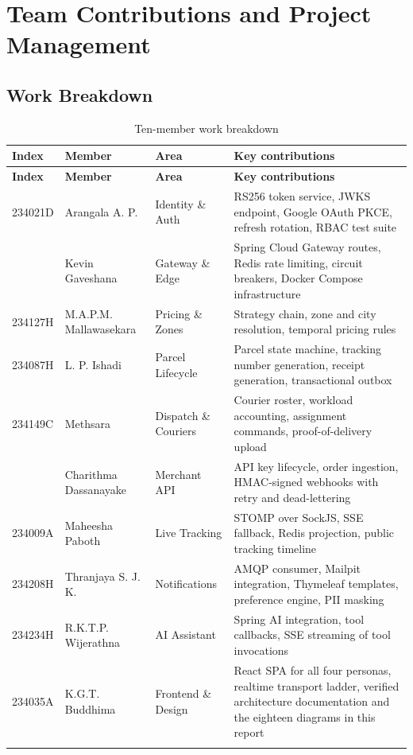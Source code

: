\documentclass[11pt,a4paper,oneside,openany]{report}
\begin{document}
\chapter{Team Contributions and Project Management}

\section{Work Breakdown}
\begin{center}
\small
\begin{longtable}{@{}p{2.0cm}p{3.4cm}p{2.9cm}p{5.1cm}@{}}
\toprule
\textbf{Index} & \textbf{Member} & \textbf{Area} & \textbf{Key contributions} \\
\midrule
\endfirsthead
\toprule
\textbf{Index} & \textbf{Member} & \textbf{Area} & \textbf{Key contributions} \\
\midrule
\endhead
234021D & Arangala A. P. & Identity \& Auth & RS256 token service, JWKS endpoint, Google OAuth
PKCE, refresh rotation, RBAC test suite \\
\addlinespace
        & Kevin Gaveshana & Gateway \& Edge & Spring Cloud Gateway routes, Redis rate limiting, circuit
breakers, Docker Compose infrastructure \\
\addlinespace
234127H & M.A.P.M. Mallawasekara & Pricing \& Zones & Strategy chain, zone and city resolution, temporal pricing
rules \\
\addlinespace
234087H & L. P. Ishadi & Parcel Lifecycle & Parcel state machine, tracking number generation,
receipt generation, transactional outbox \\
\addlinespace
234149C & Methsara & Dispatch \& Couriers & Courier roster, workload accounting,
assignment commands, proof-of-delivery upload \\
\addlinespace
        & Charithma Dassanayake & Merchant API & API key lifecycle, order ingestion, HMAC-signed
webhooks with retry and dead-lettering \\
\addlinespace
234009A & Maheesha Paboth & Live Tracking & STOMP over SockJS, SSE fallback, Redis projection,
public tracking timeline \\
\addlinespace
234208H & Thranjaya S. J. K. & Notifications & AMQP consumer, Mailpit integration, Thymeleaf
templates, preference engine, PII masking \\
\addlinespace
234234H & R.K.T.P. Wijerathna & AI Assistant & Spring AI integration, tool callbacks, SSE
streaming of tool invocations \\
\addlinespace
234035A & K.G.T. Buddhima & Frontend \& Design & React SPA for all four personas, realtime
transport ladder, verified architecture documentation and the eighteen diagrams in this report \\
\bottomrule
\caption{Ten-member work breakdown}\label{tab:team}
\end{longtable}
\end{center}
\end{document}
